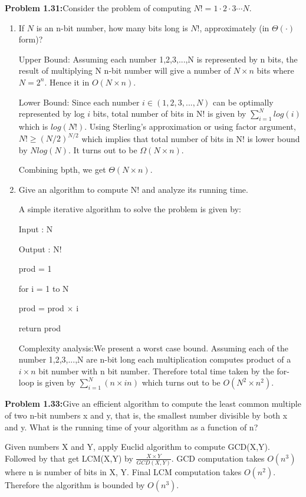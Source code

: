 \documentclass[11pt]{article}
\begin{document}
	\textbf{Problem 1.31:}Consider the problem of computing $N! = 1\cdot2\cdot3\cdots N$.
	\begin{enumerate}[label=(\alph*)]
		\item If $N$ is an n-bit number, how many bits long is $N!$, approximately (in $\Theta(\cdot)$ form)?
		
		Upper Bound: Assuming each number 1,2,3,...,N is represented by n bits, the result of multiplying N n-bit number will give a number of $N\times n$ bits where $N=2^n$. Hence it in $O(N\times n)$.
		
		Lower Bound: Since each number $i \in (1,2,3, ..., N)$ can be optimally represented by log $i$ bits, total number of bits in N! is given by $\sum_{i=1}^N log(i)$ which is $log(N!)$. Using Sterling's approximation or using factor argument, $N! \geq (N/2)^{N/2}$ which implies that total number of bits in N! is lower bound by $Nlog(N)$. It turns out to be $\Omega(N\times n)$.
		
		Combining bpth, we get $\Theta(N\times n)$.
		
		\item Give an algorithm to compute N! and analyze its running time.
		
		A simple iterative algorithm to solve the problem is given by:
		
		Input : N
		
		Output : N!
		
		prod = 1
		
		for i = 1 to N
		
		\hspace{0.25in} prod = prod $\times$ i
		
		return prod
		
		Complexity analysis:We present a worst case bound. Assuming each of the number 1,2,3,...,N are n-bit long each multiplication computes product of a
		$i \times n$ bit number with n bit number. Therefore total time taken by the for-loop
		is given by $\sum_{i=1}^N (n\times in)$ which turns out to be $O(N^2 \times n^2)$.
	\end{enumerate}
	
	\textbf{Problem 1.33:}Give an efficient algorithm to compute the least common multiple of two n-bit numbers x and y, that is, the smallest number divisible by both x and y. What is the running time of your algorithm as a function of n?
	
	Given numbers X and Y, apply Euclid algorithm to compute GCD(X,Y). Followed by that get LCM(X,Y) by $\frac{X \times Y}{GCD(X,Y)}$. GCD computation takes $O(n^3)$ where n is number of bits in X, Y. Final LCM computation takes $O(n^2)$. Therefore the algorithm is bounded by $O(n^3)$.
	
	

	
\end{document}
